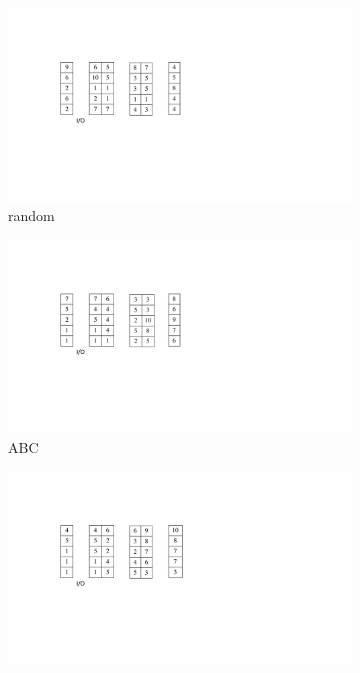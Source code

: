 \documentclass[hyp]{socreport}
\begin{document}
\begin{figure}
\begin{subfigure}{.5\textwidth}
	\includegraphics[scale=0.5]{random}
	\centering
	\caption{random}
	\label{fig1.3:a}
\end{subfigure}
\begin{subfigure}{.5\textwidth}
	\includegraphics[scale=0.5]{abc}
	\centering
	\caption{ABC}
	\label{fig1.3:b}
\end{subfigure}
\begin{subfigure}{.5\textwidth}
	\includegraphics[scale=0.5]{coi}

\end{subfigure}
\end{figure}
\end{document}
